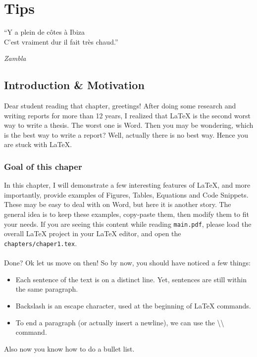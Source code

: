 
\chapter{Tips} %

\epigraph{``Y a plein de c\^otes \`a Ibiza\\C'est vraiment dur il fait tr\`es chaud.''}{\textit{Zambla}}

\label{chapter1} %

\section{Introduction & Motivation}
Dear student reading that chapter, greetings!
After doing some research and writing reports for more than 12 years, I realized that LaTeX is the second worst way to write a thesis.
The worst one is Word.
Then you may be wondering, which is the best way to write a report?
Well, actually there is no best way.
Hence you are stuck with LaTeX.

\subsection{Goal of this chaper}
In this chapter, I will demonstrate a few interesting features of LaTeX, and more importantly, provide examples of Figures, Tables, Equations and Code Snippets.
These may be easy to deal with on Word, but here it is another story.
The general idea is to keep these examples, copy-paste them, then modify them to fit your needs.
If you are seeing this content while reading \texttt{main.pdf}, please load the overall LaTeX project in your LaTeX editor, and open the \texttt{chapters/chaper1.tex}.
\\
\\
Done?
Ok let us move on then!
So by now, you should have noticed a few things:
\begin{itemize}
  \item Each sentence of the text is on a distinct line. Yet, sentences are still within the same paragraph.
  \item Backslash is an escape character, used at the beginning of LaTeX commands.
  \item To end a paragraph (or actually insert a newline), we can use the \textbackslash{}\textbackslash{} command.
\end{itemize}
Also now you know how to do a bullet list.

